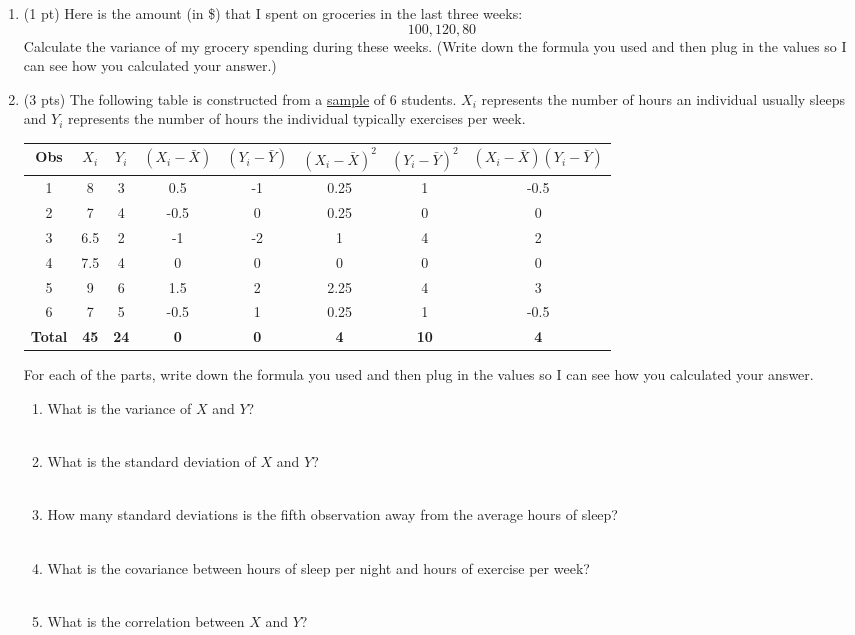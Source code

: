 \documentclass{./../../Latex/handout}
\begin{document}
\begin{enumerate}
\item (1 pt) Here is the amount (in \$) that I spent on groceries in the last three weeks: 
$$ 100, 120, 80  $$
Calculate the variance of my grocery spending during these weeks. (Write down the formula you used and then plug in the values so I can see how you calculated your answer.)

\newpage
\item (3 pts) The following table is constructed from a \underline{sample} of 6 students. $X_i$ represents the number of hours an individual usually sleeps and $Y_i$ represents the number of hours the individual typically exercises per week.  
\begin{center}
\footnotesize
\def\arraystretch{1.5}%
\begin{tabular}{|c|c|c|c|c|c|c|c|}
\hline
Obs & $X_i$ & $Y_i$ & $(X_i-\bar{X})$ & $(Y_i-\bar{Y})$ & $(X_i-\bar{X})^2$ & $(Y_i-\bar{Y})^2$ & $(X_i-\bar{X})(Y_i-\bar{Y})$  \\ \hline
1 & 8 & 3 & 0.5 & -1 & 0.25 & 1 & -0.5 \\ \hline
2 & 7 & 4 & -0.5 & 0 & 0.25 & 0 & 0 \\ \hline
3 & 6.5 & 2 & -1 & -2 & 1 & 4 & 2 \\ \hline
4 & 7.5 & 4 & 0 & 0 & 0 & 0 & 0 \\ \hline
5 & 9 & 6 & 1.5 & 2 & 2.25 & 4 & 3 \\ \hline
6 & 7 & 5 & -0.5 & 1 & 0.25 & 1 & -0.5 \\ \hline
\textbf{Total} & \textbf{45} & \textbf{24} & \textbf{0} & \textbf{0} & \textbf{4} & \textbf{10} & \textbf{4} \\ \hline
\end{tabular}
\end{center}
For each of the parts, write down the formula you used and then plug in the values so I can see how you calculated your answer.
\begin{enumerate}
\item What is the variance of $X$ and $Y$? \\~\\
\item What is the standard deviation of $X$ and $Y$? \\~\\
\item How many standard deviations is the fifth observation away from the average hours of sleep? \\~\\
\item What is the covariance between hours of sleep per night and hours of exercise per week? \\~\\
\item What is the correlation between $X$ and $Y$? \\~\\
\end{enumerate}


\end{enumerate}
\end{document}
